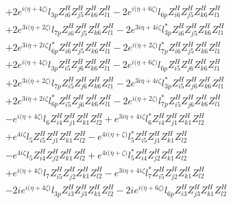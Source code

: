 \begin{align}
 &+2 e^{i \Big(\eta +4 \zeta \Big)} l_{3p} Z_{{i 6}}^{H} Z_{{j 5}}^{H} Z_{{k 6}}^{H} Z_{{l 1}}^{H} -2 e^{i \Big(\eta +6 \zeta \Big)} l_{6p} Z_{{i 6}}^{H} Z_{{j 5}}^{H} Z_{{k 6}}^{H} Z_{{l 1}}^{H} \nonumber \\ 
 &+2 e^{3 i \Big(\eta +2 \zeta \Big)} l_{7p} Z_{{i 6}}^{H} Z_{{j 5}}^{H} Z_{{k 6}}^{H} Z_{{l 1}}^{H} -2 e^{3 i \eta +4 i \zeta } l_{3p}^* Z_{{i 6}}^{H} Z_{{j 5}}^{H} Z_{{k 6}}^{H} Z_{{l 1}}^{H} \nonumber \\ 
 &+2 e^{3 i \eta +2 i \zeta } l_{6p}^* Z_{{i 6}}^{H} Z_{{j 5}}^{H} Z_{{k 6}}^{H} Z_{{l 1}}^{H} -2 e^{i \Big(\eta +2 \zeta \Big)} l_{7p}^* Z_{{i 6}}^{H} Z_{{j 5}}^{H} Z_{{k 6}}^{H} Z_{{l 1}}^{H} \nonumber \\ 
 &+2 e^{i \Big(\eta +4 \zeta \Big)} l_{3p} Z_{{i 5}}^{H} Z_{{j 6}}^{H} Z_{{k 6}}^{H} Z_{{l 1}}^{H} -2 e^{i \Big(\eta +6 \zeta \Big)} l_{6p} Z_{{i 5}}^{H} Z_{{j 6}}^{H} Z_{{k 6}}^{H} Z_{{l 1}}^{H} \nonumber \\ 
 &+2 e^{3 i \Big(\eta +2 \zeta \Big)} l_{7p} Z_{{i 5}}^{H} Z_{{j 6}}^{H} Z_{{k 6}}^{H} Z_{{l 1}}^{H} -2 e^{3 i \eta +4 i \zeta } l_{3p}^* Z_{{i 5}}^{H} Z_{{j 6}}^{H} Z_{{k 6}}^{H} Z_{{l 1}}^{H} \nonumber \\ 
 &+2 e^{3 i \eta +2 i \zeta } l_{6p}^* Z_{{i 5}}^{H} Z_{{j 6}}^{H} Z_{{k 6}}^{H} Z_{{l 1}}^{H} -2 e^{i \Big(\eta +2 \zeta \Big)} l_{7p}^* Z_{{i 5}}^{H} Z_{{j 6}}^{H} Z_{{k 6}}^{H} Z_{{l 1}}^{H} \nonumber \\ 
 &- e^{i \Big(\eta +4 \zeta \Big)} l_6 Z_{{i 4}}^{H} Z_{{j 1}}^{H} Z_{{k 1}}^{H} Z_{{l 2}}^{H} +e^{3 i \eta +4 i \zeta } l_6^* Z_{{i 4}}^{H} Z_{{j 1}}^{H} Z_{{k 1}}^{H} Z_{{l 2}}^{H} \nonumber \\ 
 &+e^{4 i \zeta } l_5 Z_{{i 5}}^{H} Z_{{j 1}}^{H} Z_{{k 1}}^{H} Z_{{l 2}}^{H} - e^{4 i \Big(\eta +\zeta \Big)} l_5^* Z_{{i 5}}^{H} Z_{{j 1}}^{H} Z_{{k 1}}^{H} Z_{{l 2}}^{H} \nonumber \\ 
 &- e^{4 i \zeta } l_5 Z_{{i 4}}^{H} Z_{{j 2}}^{H} Z_{{k 1}}^{H} Z_{{l 2}}^{H} +e^{4 i \Big(\eta +\zeta \Big)} l_5^* Z_{{i 4}}^{H} Z_{{j 2}}^{H} Z_{{k 1}}^{H} Z_{{l 2}}^{H} \nonumber \\ 
 &+e^{i \Big(\eta +4 \zeta \Big)} l_7 Z_{{i 5}}^{H} Z_{{j 2}}^{H} Z_{{k 1}}^{H} Z_{{l 2}}^{H} - e^{3 i \eta +4 i \zeta } l_7^* Z_{{i 5}}^{H} Z_{{j 2}}^{H} Z_{{k 1}}^{H} Z_{{l 2}}^{H} \nonumber \\ 
 &-2 i e^{i \Big(\eta +4 \zeta \Big)} l_{3p} Z_{{i 3}}^{H} Z_{{j 3}}^{H} Z_{{k 1}}^{H} Z_{{l 2}}^{H} -2 i e^{i \Big(\eta +6 \zeta \Big)} l_{6p} Z_{{i 3}}^{H} Z_{{j 3}}^{H} Z_{{k 1}}^{H} Z_{{l 2}}^{H} \nonumber \\ 

\end{align}
